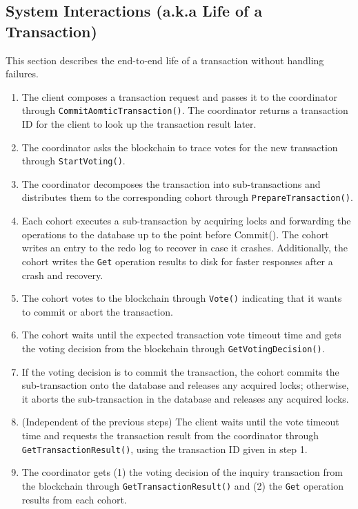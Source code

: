 \documentclass[11pt,sigplan,screen,nonacm]{acmart}
\begin{document}
\subsection{System Interactions (a.k.a Life of a Transaction)} \label{txnflow}

This section describes the end-to-end life of a transaction without handling failures.

\begin{enumerate}
  \item The client composes a transaction request and passes it to the coordinator through \texttt{CommitAomticTransaction()}. The coordinator returns a transaction ID for the client to look up the transaction result later.
  \item The coordinator asks the blockchain to trace votes for the new transaction through \texttt{StartVoting()}.
  \item The coordinator decomposes the transaction into sub-transactions and distributes them to the corresponding cohort through \texttt{PrepareTransaction()}.
  \item Each cohort executes a sub-transaction by acquiring locks and forwarding the operations to the database up to the point before Commit(). The cohort writes an entry to the redo log to recover in case it crashes. Additionally, the cohort writes the \texttt{Get} operation results to disk for faster responses after a crash and recovery.
  \item The cohort votes to the blockchain through \texttt{Vote()} indicating that it wants to commit or abort the transaction.
  \item The cohort waits until the expected transaction vote timeout time and gets the voting decision from the blockchain through \texttt{GetVotingDecision()}.
  \item If the voting decision is to commit the transaction, the cohort commits the sub-transaction onto the database and releases any acquired locks; otherwise, it aborts the sub-transaction in the database and releases any acquired locks.
  \item (Independent of the previous steps) The client waits until the vote timeout time and requests the transaction result from the coordinator through \texttt{GetTransactionResult()}, using the transaction ID given in step 1.
  \item The coordinator gets (1) the voting decision of the inquiry transaction from the blockchain through \texttt{GetTransactionResult()} and (2) the \texttt{Get} operation results from each cohort.
\end{enumerate}
\end{document}

